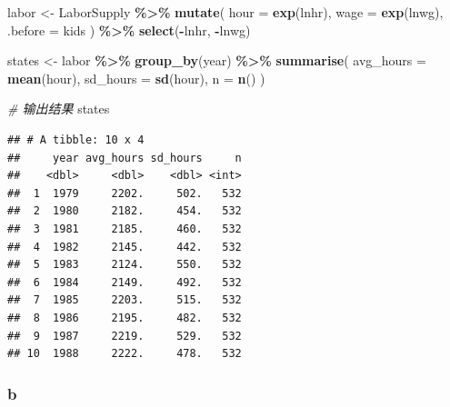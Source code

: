 \documentclass[
]{article}
\newenvironment{Shaded}{\begin{snugshade}}{\end{snugshade}}
\newcommand{\AttributeTok}[1]{\textcolor[rgb]{0.13,0.29,0.53}{#1}}
\newcommand{\CommentTok}[1]{\textcolor[rgb]{0.56,0.35,0.01}{\textit{#1}}}
\newcommand{\FunctionTok}[1]{\textcolor[rgb]{0.13,0.29,0.53}{\textbf{#1}}}
\newcommand{\NormalTok}[1]{#1}
\newcommand{\OtherTok}[1]{\textcolor[rgb]{0.56,0.35,0.01}{#1}}
\newcommand{\SpecialCharTok}[1]{\textcolor[rgb]{0.81,0.36,0.00}{\textbf{#1}}}
\begin{document}
\begin{Shaded}
\begin{Highlighting}[]
\NormalTok{labor }\OtherTok{\textless{}{-}}\NormalTok{ LaborSupply }\SpecialCharTok{\%\textgreater{}\%} 
  \FunctionTok{mutate}\NormalTok{(}
    \AttributeTok{hour =} \FunctionTok{exp}\NormalTok{(lnhr),         }
    \AttributeTok{wage =} \FunctionTok{exp}\NormalTok{(lnwg),         }
    \AttributeTok{.before =}\NormalTok{ kids           }
\NormalTok{  ) }\SpecialCharTok{\%\textgreater{}\%} 
  \FunctionTok{select}\NormalTok{(}\SpecialCharTok{{-}}\NormalTok{lnhr, }\SpecialCharTok{{-}}\NormalTok{lnwg) }

\NormalTok{states }\OtherTok{\textless{}{-}}\NormalTok{ labor }\SpecialCharTok{\%\textgreater{}\%} 
  \FunctionTok{group\_by}\NormalTok{(year) }\SpecialCharTok{\%\textgreater{}\%} 
  \FunctionTok{summarise}\NormalTok{(}
    \AttributeTok{avg\_hours =} \FunctionTok{mean}\NormalTok{(hour),}
    \AttributeTok{sd\_hours =} \FunctionTok{sd}\NormalTok{(hour),}
    \AttributeTok{n =} \FunctionTok{n}\NormalTok{()}
\NormalTok{  )}

\CommentTok{\# 输出结果}
\NormalTok{states}
\end{Highlighting}
\end{Shaded}

\begin{verbatim}
## # A tibble: 10 x 4
##     year avg_hours sd_hours     n
##    <dbl>     <dbl>    <dbl> <int>
##  1  1979     2202.     502.   532
##  2  1980     2182.     454.   532
##  3  1981     2185.     460.   532
##  4  1982     2145.     442.   532
##  5  1983     2124.     550.   532
##  6  1984     2149.     492.   532
##  7  1985     2203.     515.   532
##  8  1986     2195.     482.   532
##  9  1987     2219.     529.   532
## 10  1988     2222.     478.   532
\end{verbatim}

\subsubsection{b}\label{b-5}
\end{document}
